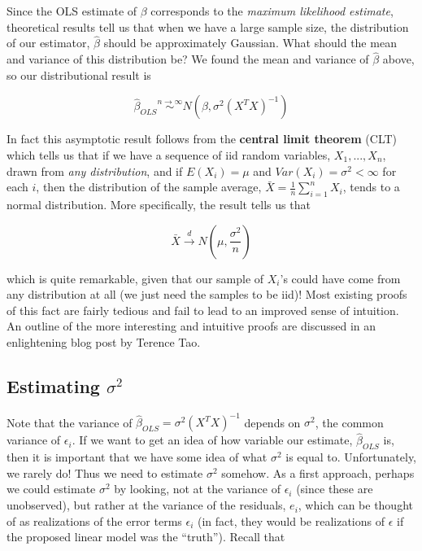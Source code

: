 Since the OLS estimate of $\beta$ corresponds to the \textit{maximum likelihood estimate}, theoretical results tell us that when we have a large sample size, the distribution of our estimator, $\hat{\beta}$ should be approximately Gaussian. What should the mean and variance of this distribution be? We found the mean and variance of $\hat{\beta}$ above, so our distributional result is

$$\hat{\beta}_{OLS} \overset{n \rightarrow \infty}{\sim} N\left( \beta, \sigma^2 (X^TX)^{-1} \right)$$


In fact this asymptotic result follows from the {\bf central limit theorem} (CLT) which tells us that if we have a sequence of iid random variables, $X_1, ..., X_n$, drawn from \textit{any distribution}, and if $E(X_i) = \mu$ and $Var(X_i) = \sigma^2 < \infty$ for each $i$, then the distribution of the sample average, $\bar{X} = \frac{1}{n}\sum_{i=1}^n X_i$, tends to a normal distribution. More specifically, the result tells us that 

$$ \bar{X} \overset{d}{\rightarrow} N\left(\mu, \frac{\sigma^2}{n}\right)$$

which is quite remarkable, given that our sample of $X_i$'s could have come from any distribution at all (we just need the samples to be iid)! Most existing proofs of this fact are fairly tedious and fail to lead to an improved sense of intuition. An outline of the more interesting and intuitive proofs are discussed in an enlightening blog post by Terence Tao.



\subsection*{Estimating $\sigma^2$}

Note that the variance of $\hat{\beta}_{OLS} = \sigma^2 (X^TX)^{-1}$ depends on $\sigma^2$, the common variance of $\epsilon_i$. If we want to get an idea of how variable our estimate, $\hat{\beta}_{OLS}$ is, then it is important that we have some idea of what $\sigma^2$ is equal to. Unfortunately, we rarely do! Thus we need to estimate $\sigma^2$ somehow. As a first approach, perhaps we could estimate $\sigma^2$ by looking, not at the variance of $\epsilon_i$ (since these are unobserved), but rather at the variance of the residuals, $e_i$, which can be thought of as realizations of the error terms $\epsilon_i$ (in fact, they would be realizations of $\epsilon$ if the proposed linear model was the ``truth''). Recall that


